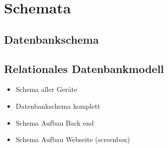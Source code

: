 \section{Schemata}

\subsection{Datenbankschema}
\label{anhang:Datenbankschema}


\subsection{Relationales Datenbankmodell}
\label{anhang:relationalesDatenbankmodell}

\begin{itemize}
	\item Schema aller Geräte
	\item Datenbankschema komplett
	\item Schema Aufbau Back end
	\item Schema Aufbau Webseite (screenbox)
\end{itemize}
